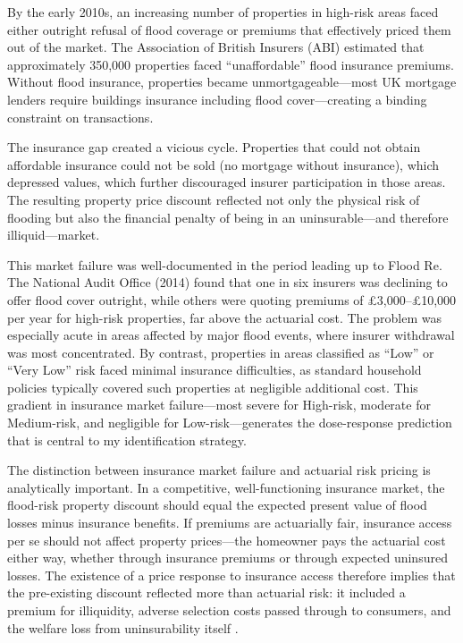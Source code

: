 \documentclass[12pt]{article}
\begin{document}
By the early 2010s, an increasing number of properties in high-risk areas faced either outright refusal of flood coverage or premiums that effectively priced them out of the market. The Association of British Insurers (ABI) estimated that approximately 350,000 properties faced ``unaffordable'' flood insurance premiums. Without flood insurance, properties became unmortgageable---most UK mortgage lenders require buildings insurance including flood cover---creating a binding constraint on transactions.

The insurance gap created a vicious cycle. Properties that could not obtain affordable insurance could not be sold (no mortgage without insurance), which depressed values, which further discouraged insurer participation in those areas. The resulting property price discount reflected not only the physical risk of flooding but also the financial penalty of being in an uninsurable---and therefore illiquid---market.

This market failure was well-documented in the period leading up to Flood Re. The National Audit Office (2014) found that one in six insurers was declining to offer flood cover outright, while others were quoting premiums of \pounds3,000--\pounds10,000 per year for high-risk properties, far above the actuarial cost. The problem was especially acute in areas affected by major flood events, where insurer withdrawal was most concentrated. By contrast, properties in areas classified as ``Low'' or ``Very Low'' risk faced minimal insurance difficulties, as standard household policies typically covered such properties at negligible additional cost. This gradient in insurance market failure---most severe for High-risk, moderate for Medium-risk, and negligible for Low-risk---generates the dose-response prediction that is central to my identification strategy.

The distinction between insurance market failure and actuarial risk pricing is analytically important. In a competitive, well-functioning insurance market, the flood-risk property discount should equal the expected present value of flood losses minus insurance benefits. If premiums are actuarially fair, insurance access per se should not affect property prices---the homeowner pays the actuarial cost either way, whether through insurance premiums or through expected uninsured losses. The existence of a price response to insurance access therefore implies that the pre-existing discount reflected more than actuarial risk: it included a premium for illiquidity, adverse selection costs passed through to consumers, and the welfare loss from uninsurability itself \citep{arrow1963uncertainty, jaffee2010role}.
\end{document}

